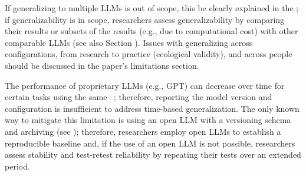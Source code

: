
If generalizing to multiple LLMs is out of scope, this \must be clearly explained in the \paper; if generalizability is in scope, researchers \must assess generalizability by comparing their results or subsets of the results (e.g., due to computational cost) with other comparable LLMs (see also Section \openllm). Issues with generalizing across configurations, from research to practice (ecological validity), and across people should be discussed in the paper's limitations section. 

The performance of proprietary LLMs (e.g., GPT) can decrease over time for certain tasks using the same ~\cite{DBLP:journals/corr/abs-2307-09009, doi:10.1148/radiol.232411}; therefore, reporting the model version and configuration is insufficient to address time-based generalization. The only known way to mitigate this limitation is using an open LLM with a versioning schema and archiving (see \openllm); therefore, researchers \should employ open LLMs to establish a reproducible baseline and, if the use of an open LLM is not possible, researchers \should assess stability and test-retest reliability by repeating their tests over an extended period.

